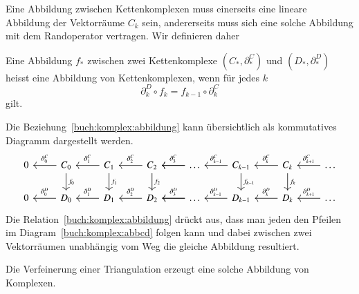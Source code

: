Eine Abbildung zwischen Kettenkomplexen muss einerseits eine lineare
Abbildung der Vektorräume $C_k$ sein, andererseits muss sich eine
solche Abbildung mit dem Randoperator vertragen.
Wir definieren daher

\begin{definition}
Eine Abbildung $f_*$ zwischen zwei Kettenkomplexe $(C_*,\partial^C_*)$ und 
$(D_*,\partial^D_*)$ heisst eine Abbildung von Kettenkomplexen, wenn
für jedes $k$ 
\begin{equation}
\partial^D_k
\circ
f_{k}
=
f_{k-1}
\circ
\partial^C_k
\label{buch:komplex:abbildung}
\end{equation}
gilt.
\end{definition}

Die Beziehung~\eqref{buch:komplex:abbildung} kann übersichtlich als
kommutatives Diagramm dargestellt werden.
\begin{equation}
\begin{tikzcd}
0 
	& C_0 \arrow[l, "\partial_0^C" above]
		\arrow[d, "f_0"]
		& C_1 \arrow[l,"\partial_1^C" above]
			\arrow[d, "f_1"]
			& C_2 \arrow[l,"\partial_2^C" above]
				\arrow[d, "f_2"]
				& \dots \arrow[l]
					\arrow[l, "\partial_{3}^C" above]
					& C_{k-1}
						\arrow[l, "\partial_{k-1}^C" above]
						\arrow[d, "f_{k-1}"]
						& C_{k}\arrow[l, "\partial_{k}^C" above]
							\arrow[d, "f_{k}"]
							& \dots
								\arrow[l,"\partial_{k+1}^C" above]
\\
0 
	& D_0 \arrow[l, "\partial_0^D" above]
		& D_1 \arrow[l,"\partial_1^D" above]
			& D_2 \arrow[l,"\partial_2^D" above]
				& \dots \arrow[l]
					\arrow[l, "\partial_{3}^D" above]
					& D_{k-1}
						\arrow[l, "\partial_{k-1}^D" above]
						& D_{k}\arrow[l, "\partial_{k}^D" above]
							& \dots
								\arrow[l,"\partial_{k+1}^D" above]
\end{tikzcd}
\label{buch:komplex:abbcd}
\end{equation}
Die Relation~\eqref{buch:komplex:abbildung} drückt aus, dass man jeden
den Pfeilen im Diagram~\eqref{buch:komplex:abbcd} folgen kann und
dabei zwischen zwei Vektorräumen unabhängig vom Weg die gleiche Abbildung
resultiert.

Die Verfeinerung einer Triangulation erzeugt eine solche Abbildung von
Komplexen.



